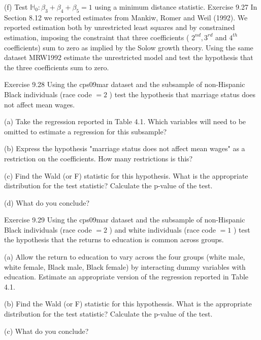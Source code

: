 \documentclass[10pt]{article}
\begin{document}
(f) Test $\mathbb{H}_{0}: \beta_{3}+\beta_{4}+\beta_{5}=1$ using a minimum distance statistic. Exercise 9.27 In Section 8.12 we reported estimates from Mankiw, Romer and Weil (1992). We reported estimation both by unrestricted least squares and by constrained estimation, imposing the constraint that three coefficients ( $2^{n d}, 3^{r d}$ and $4^{t h}$ coefficients) sum to zero as implied by the Solow growth theory. Using the same dataset MRW1992 estimate the unrestricted model and test the hypothesis that the three coefficients sum to zero.

Exercise 9.28 Using the cps09mar dataset and the subsample of non-Hispanic Black individuals (race code $=2$ ) test the hypothesis that marriage status does not affect mean wages.

(a) Take the regression reported in Table 4.1. Which variables will need to be omitted to estimate a regression for this subsample?

(b) Express the hypothesis "marriage status does not affect mean wages" as a restriction on the coefficients. How many restrictions is this?

(c) Find the Wald (or F) statistic for this hypothesis. What is the appropriate distribution for the test statistic? Calculate the p-value of the test.

(d) What do you conclude?

Exercise 9.29 Using the cps09mar dataset and the subsample of non-Hispanic Black individuals (race code $=2$ ) and white individuals (race code $=1$ ) test the hypothesis that the returns to education is common across groups.

(a) Allow the return to education to vary across the four groups (white male, white female, Black male, Black female) by interacting dummy variables with education. Estimate an appropriate version of the regression reported in Table 4.1.

(b) Find the Wald (or F) statistic for this hypothessis. What is the appropriate distribution for the test statistic? Calculate the p-value of the test.

(c) What do you conclude?
\end{document}
